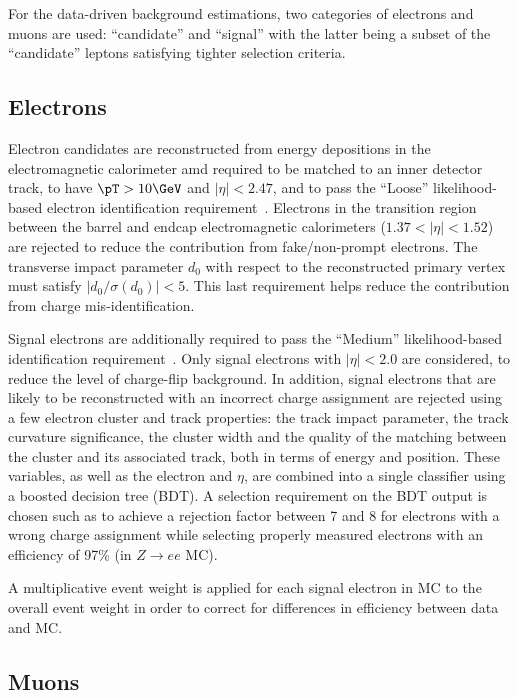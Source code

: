 For the data-driven background estimations, two categories of electrons and muons are used: 
``candidate'' and ``signal'' with the latter being a subset of the ``candidate'' leptons satisfying tighter selection criteria. 

\subsection*{Electrons}
\label{subsec:sec.strategy.sel.objects_electrons}

Electron candidates are reconstructed from energy depositions in the 
electromagnetic calorimeter amd required to be matched to an 
inner detector track, 
to have $\pT> 10 \GeV$ and $|\eta|<2.47$, and to pass the 
``Loose'' likelihood-based electron identification 
requirement~\cite{ATLAS-CONF-2016-024}.
Electrons in the transition region between the barrel and endcap 
electromagnetic calorimeters ($1.37<|\eta|<1.52$) are rejected to reduce 
the contribution from fake/non-prompt electrons. 
The transverse impact parameter $d_0$ 
with respect to the reconstructed primary vertex 
must satisfy $|d_0/\sigma(d_0)|<5$.
This last requirement helps reduce the contribution from charge 
mis-identification. 

Signal electrons are additionally required to pass the ``Medium'' 
likelihood-based identification requirement~\cite{ATLAS-CONF-2016-024}.
Only signal electrons with $|\eta|<2.0$ are considered, 
to reduce the level of charge-flip background.
In addition, signal electrons that are likely to be reconstructed with an incorrect charge assignment are rejected using a few electron cluster and track properties: the track impact parameter, the track curvature significance, the cluster width and the quality of the matching between the cluster and its associated track, both in terms of energy and position. These variables, as well as the electron \pt and $\eta$, are combined into a single classifier using a boosted decision tree (BDT). A selection requirement on the BDT output is chosen such as to achieve a rejection factor between 7 and 8 for electrons with a wrong charge assignment while selecting properly measured electrons with an efficiency of 97\% (in $Z\rightarrow ee$ MC). 

A multiplicative event weight is applied for each signal electron in MC to the overall event weight 
in order to correct for differences in efficiency between data and MC.

\subsection*{Muons}
\label{subsec:sec.strategy.sel.objects_muons}

